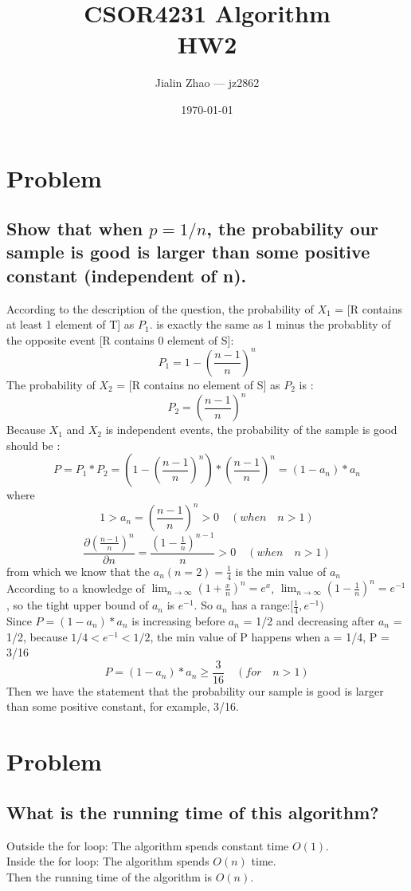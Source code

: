 \documentclass{article}
\title{CSOR4231 Algorithm\\HW2}
\author{Jialin Zhao --- jz2862}
\date{\today}
\begin{document}
 
\maketitle{} 
\section{Problem \uppercase\expandafter{}} 
\subsection{Show that when $p = 1/n$, the probability our sample is good is larger than some positive
constant (independent of n).}
According to the description of the question, the probability of $X_1$ = [R contains at least 1 element of T] as $P_1$. is exactly the same as 1 minus the probablity of the opposite event [R contains 0 element of S]:
$$P_1 = 1 - (\frac{n-1}{n})^n$$
The probability of $X_2$ = [R contains no element of S] as $P_2$ is :
$$P_2 = (\frac{n-1}{n})^n$$
Because $X_1$ and $X_2$ is independent events, the probability of the sample is good should be :
$$P = P_1 * P_2=(1 - (\frac{n-1}{n})^n)*(\frac{n-1}{n})^n = (1-a_n)*a_n$$
where $$1>a_n = (\frac{n-1}{n})^n>0\quad (when\quad n>1)$$
$$\frac{\partial (\frac{n-1}{n})^n}{\partial n} = \frac{(1-\frac{1}{n})^{n-1}}{n}>0 \quad (when\quad n>1)$$
from which we know that the $a_n(n=2) =\frac{1}{4}$ is the min value of $a_n$\\
According to a knowledge of $\lim_{n\to \infty}(1+{\frac{x}{n}})^n = e^x$, $\lim_{n \to \infty}({1-\frac{1}{n}})^n=e^{-1}$, so the tight upper bound of $a_n$ is $e^{-1}$.   So $a_n$ has a range:$[\frac{1}{4},e^{-1})$\\
Since $P=(1-a_n)*a_n$ is increasing before $a_n$ = 1/2 and decreasing after $a_n$ = 1/2, because $1/4<e^{-1}<1/2$, the min value of P happens when a = 1/4, P = 3/16\\
$$P = (1-a_n)*a_n \ge \frac{3}{16}\quad (for\quad n >1)$$
Then we have the statement that the probability our sample is good is larger than some positive constant, for example, 3/16.
\clearpage
\section{Problem \uppercase\expandafter{}} 
\subsection{What is the running time of this algorithm?}
Outside the for loop: The algorithm spends constant time $O(1)$.\\
Inside the for loop: The algorithm spends $O(n)$ time.\\
Then the running time of the algorithm is $O(n)$.
\end{document}
